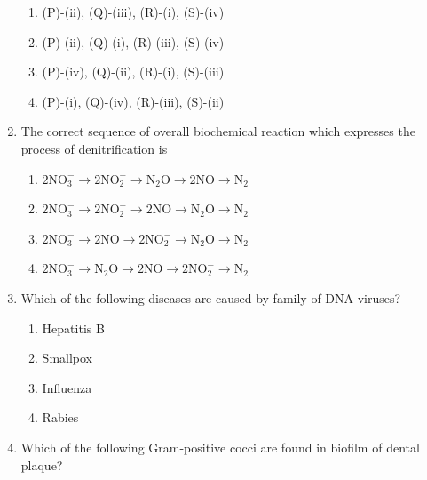 \documentclass[journal,12pt,onecolumn]{IEEEtran}
\theoremstyle{remark}
\begin{document}
\begin{enumerate}
    \begin{enumerate}
        \item (P)-(ii), (Q)-(iii), (R)-(i), (S)-(iv)
        \item (P)-(ii), (Q)-(i), (R)-(iii), (S)-(iv)
        \item (P)-(iv), (Q)-(ii), (R)-(i), (S)-(iii)
        \item (P)-(i), (Q)-(iv), (R)-(iii), (S)-(ii)
    \end{enumerate}

    \item The correct sequence of overall biochemical reaction which expresses the process of denitrification is \underline{\hspace{2cm}}

    \hfill{}

    \begin{enumerate}
        \item $2\text{NO}_3^- \rightarrow 2\text{NO}_2^- \rightarrow \text{N}_2\text{O} \rightarrow 2\text{NO} \rightarrow \text{N}_2$
        \item $2\text{NO}_3^- \rightarrow 2\text{NO}_2^- \rightarrow 2\text{NO} \rightarrow \text{N}_2\text{O} \rightarrow \text{N}_2$
        \item $2\text{NO}_3^- \rightarrow 2\text{NO} \rightarrow 2\text{NO}_2^- \rightarrow \text{N}_2\text{O} \rightarrow \text{N}_2$
        \item $2\text{NO}_3^- \rightarrow \text{N}_2\text{O} \rightarrow 2\text{NO} \rightarrow 2\text{NO}_2^- \rightarrow \text{N}_2$
    \end{enumerate}

    \item Which of the following diseases are caused by family of DNA viruses?

    \hfill{}

    \begin{enumerate}
        \item Hepatitis B
        \item Smallpox
        \item Influenza
        \item Rabies
    \end{enumerate}

    \item Which of the following Gram-positive cocci are found in biofilm of dental plaque?

    \hfill{}


\end{enumerate}
\end{document}
